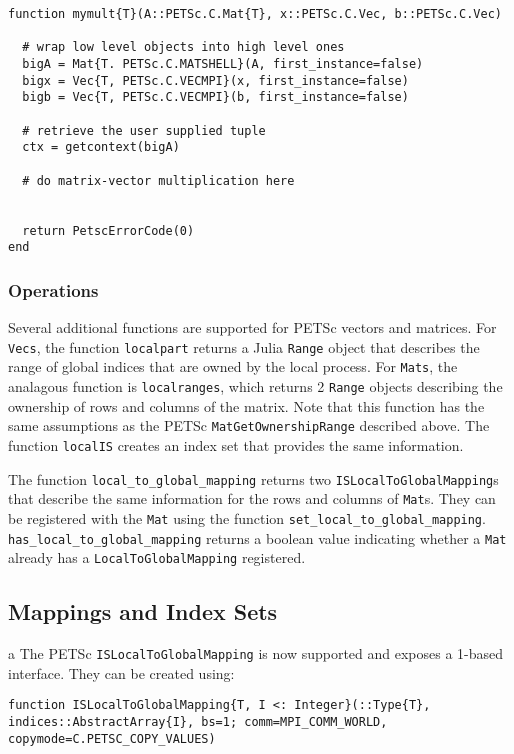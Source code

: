 \documentclass{article}
\begin{document}
\begin{verbatim}
function mymult{T}(A::PETSc.C.Mat{T}, x::PETSc.C.Vec, b::PETSc.C.Vec)

  # wrap low level objects into high level ones
  bigA = Mat{T. PETSc.C.MATSHELL}(A, first_instance=false)
  bigx = Vec{T, PETSc.C.VECMPI}(x, first_instance=false)
  bigb = Vec{T, PETSc.C.VECMPI}(b, first_instance=false)

  # retrieve the user supplied tuple
  ctx = getcontext(bigA)

  # do matrix-vector multiplication here
  

  return PetscErrorCode(0)
end
\end{verbatim}


\subsubsection{Operations}
Several additional functions are supported for PETSc vectors and matrices.
For \texttt{Vecs}, the function \texttt{localpart} returns a Julia \texttt{Range} object that describes the range of global indices that are owned by the 
local process.
For \texttt{Mats}, the analagous function is \texttt{localranges}, which 
returns 2 \texttt{Range} objects describing the ownership of rows and columns
of the matrix.  Note that this function has the same assumptions as the PETSc
\texttt{MatGetOwnershipRange} described above.
The function \texttt{localIS} creates an index set that provides the same 
information.

The function \texttt{local\_to\_global\_mapping} returns two 
\texttt{ISLocalToGlobalMapping}s that describe the same information for 
the rows and columns of \texttt{Mat}s.  They can be registered with the
\texttt{Mat} using the function \texttt{set\_local\_to\_global\_mapping}.
\texttt{has\_local\_to\_global\_mapping} returns a boolean value indicating
whether a \texttt{Mat} already has a \texttt{LocalToGlobalMapping} registered.

\subsection{Mappings and Index Sets} \label{sec:is}a
The PETSc \texttt{ISLocalToGlobalMapping} is now supported and exposes a 
1-based interface.
They can be created using:

\begin{verbatim}
function ISLocalToGlobalMapping{T, I <: Integer}(::Type{T}, indices::AbstractArray{I}, bs=1; comm=MPI_COMM_WORLD, copymode=C.PETSC_COPY_VALUES)
\end{verbatim}
\end{document}
